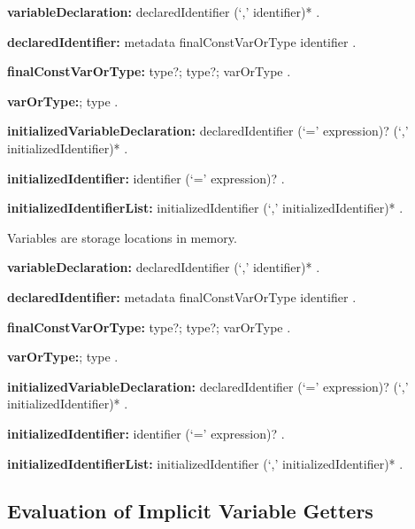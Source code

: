 \documentclass{article}
\begin{document}
\begin{grammar}
{\bf variableDeclaration:}
      declaredIdentifier
(`,'
identifier)*
      .

{\bf declaredIdentifier:}
      metadata finalConstVarOrType
                                   identifier
    .

{\bf
finalConstVarOrType:}\FINAL{}
type?;
           \CONST{} type?;
	varOrType
    .

 {\bf varOrType:}\VAR{};
	type
    .

 {\bf initializedVariableDeclaration:}
      declaredIdentifier (`=' expression)?
                         (`,' initializedIdentifier)*
    .

{\bf initializedIdentifier:}
      identifier (`=' expression)? %
    .

{\bf initializedIdentifierList:}
      initializedIdentifier (`,' initializedIdentifier)*
    .




  \end{grammar}

\LMHash{}
Variables are storage locations in memory.

\begin{grammar}
{\bf variableDeclaration:}
      declaredIdentifier (`,' identifier)*
      .

{\bf declaredIdentifier:}
      metadata finalConstVarOrType identifier
    .

{\bf finalConstVarOrType:}\FINAL{} type?;
           \CONST{} type?;
	varOrType
    .

 {\bf varOrType:}\VAR{};
	type
    .

 {\bf initializedVariableDeclaration:}
      declaredIdentifier (`=' expression)? (`,' initializedIdentifier)* %
    .

{\bf initializedIdentifier:}
      identifier (`=' expression)? %
    .

{\bf initializedIdentifierList:}
      initializedIdentifier (`,' initializedIdentifier)*
    .




  \end{grammar}

\subsection{Evaluation of Implicit  Variable Getters}
\end{document}
